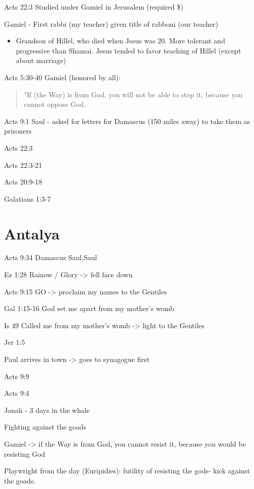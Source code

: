 \documentclass[
]{book}
\providecommand{\tightlist}{%
  \setlength{\itemsep}{0pt}\setlength{\parskip}{0pt}}
\begin{document}
Acts 22:3 Studied under Gamiel in Jerusalem (required \$)

Gamiel - First rabbi (my teacher) given title of rabboni (our teacher)

\begin{itemize}
\tightlist
\item
  Grandson of Hillel, who died when Jesus was 20. More tolerant and progressive than Shamai. Jesus tended to favor teaching of Hillel (except about marriage)
\end{itemize}

Acts 5:30-40 Gamiel (honored by all):

\begin{quote}
"If (the Way) is from God, you will not be able to stop it, because you cannot oppose God.
\end{quote}

Acts 9:1 Saul - asked for letters for Damascus (150 miles away) to take them as prisoners

Acts 22:3

Acts 22:3-21

Acts 20:9-18

Galatians 1:3-7

\hypertarget{antalya-1}{%
\chapter{Antalya}\label{antalya-1}}

Acts 9:34 Damascus Saul,Saul

Ez 1:28 Rainow / Glory -\textgreater{} fell face down

Acts 9:15 GO -\textgreater{} proclaim my names to the Gentiles

Gal 1:15-16 God set me apart from my mother's womb

Is 49 Called me from my mother's womb -\textgreater{} light to the Gentiles

Jer 1:5

Paul arrives in town -\textgreater{} goes to synagogue first

Acts 9:9

Acts 9:4

Jonah - 3 days in the whale

Fighting against the goads

Gamiel -\textgreater{} if the Way is from God, you cannot resist it, because you would be resisting God

Playwright from the day (Euripidies): futility of resisting the gods- kick against the goads.
\end{document}
